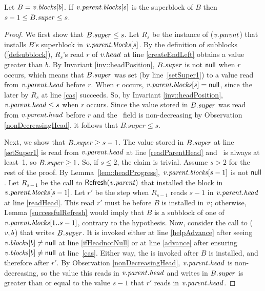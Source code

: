 \begin{lemma}
\label{superRelation}
Let $B=\mbox{\textnormal{\textit{v}}}.\mbox{\textnormal{\textit{blocks}}}[b]$.
If $\mbox{\textnormal{\textit{v}}}.\mbox{\textit{parent.blocks}}[s]$ is the superblock of $B$ then $s-1\leq B.\mbox{\textit{super}}\leq s$.
\end{lemma}
\begin{proof}
We first show that $B.\mbox{\textit{super}}\leq s$.
Let $R_s$ be the instance of ($\mbox{\textnormal{\textit{v}}}.\mbox{\textit{parent}}$) that installs $B$'s superblock 
in $\mbox{\textnormal{\textit{v}}}.\mbox{\textit{parent.blocks}}[s]$.
By the definition of subblocks (\ref{defsubblock}), $R_s$'s read $r$ of $\mbox{\textnormal{\textit{v}}}.head$ at line \ref{createEndLeft} %
obtains a value greater than $b$.
By Invariant \ref{inv::headPosition}, $B.\mbox{\textit{super}}$ is not $\mbox{\sf null}$ when $r$ occurs, which means
that $B.\mbox{\textit{super}}$ was set (by line~\ref{setSuper1}) to a value read from $\mbox{\textnormal{\textit{v}}}.\mbox{\textit{parent}}.\mbox{\textit{head}}$ before $r$.
When $r$ occurs, $\mbox{\textnormal{\textit{v}}}.\mbox{\textit{parent.blocks}}[s] = \mbox{\sf null}$, since the later  by $R_s$ at line
\ref{cas} succeeds.
So, by Invariant \ref{inv::headPosition}, $\mbox{\textnormal{\textit{v}}}.\mbox{\textit{parent}}.\mbox{\textit{head}} \leq s$ when $r$ occurs.
Since the value stored in $B.\mbox{\textit{super}}$ was read from $\mbox{\textnormal{\textit{v}}}.\mbox{\textit{parent.head}}$ before $r$ and the \head\ field is non-decreasing by Observation \ref{nonDecreasingHead}, it follows that $B.super\leq s$.

Next, we show that $B.\mbox{\textit{super}}\geq s-1$.
The value stored in $B.\mbox{\textit{super}}$ at line \ref{setSuper1} is read from $\mbox{\textnormal{\textit{v}}}.\mbox{\textit{parent}}.\mbox{\textit{head}}$ at line \ref{readParentHead} and \head\ is always at least~1, so $B.\mbox{\textit{super}} \geq 1$.
So, if $s\leq 2$, the claim is trivial.  Assume $s>2$ for the rest of the proof.
By Lemma~\ref{lem::headProgress}, $\mbox{\textnormal{\textit{v}}}.\mbox{\textit{parent.blocks}}[s-1]$ is not $\mbox{\sf null}$.  Let $R_{s-1}$ be the call to
${\sf Refresh}(\mbox{\textnormal{\textit{v}}}.\mbox{\textit{parent}})$ that installed the block in $\mbox{\textnormal{\textit{v}}}.\mbox{\textit{parent.blocks}}[s-1]$.
Let $r'$ be the step when $R_{s-1}$ reads $s-1$ in $\mbox{\textnormal{\textit{v}}}.\mbox{\textit{parent}}.\mbox{\textit{head}}$ at line \ref{readHead}.
This read $r'$ must be before $B$ is installed in $\mbox{\textnormal{\textit{v}}}$;
otherwise, Lemma \ref{successfulRefresh} would imply that $B$ is a subblock of one of 
$\mbox{\textnormal{\textit{v}}}.\mbox{\textit{parent.blocks}}[1..s-1]$, contrary to the hypothesis.
Now, consider the call to ($\mbox{\textnormal{\textit{v}}}, b$) that writes $B.\mbox{\textit{super}}$.
It is invoked either 
at line \ref{helpAdvance} after seeing $\mbox{\textnormal{\textit{v}}}.\mbox{\textit{blocks}}[b]\neq \mbox{\sf null}$ at line \ref{ifHeadnotNull}
or at line \ref{advance} after ensuring $\mbox{\textnormal{\textit{v}}}.\mbox{\textit{blocks}}[b]\neq \mbox{\sf null}$ at line~\ref{cas}.
Either way, the  is invoked after $B$ is installed, and therefore after $r'$.
By Observation \ref{nonDecreasingHead}, $\mbox{\textnormal{\textit{v}}}.\mbox{\textit{parent}}.\mbox{\textit{head}}$ is non-decreasing, so 
the value this  reads in $\mbox{\textnormal{\textit{v}}}.\mbox{\textit{parent}}.\mbox{\textit{head}}$ and
writes in $B.\mbox{\textit{super}}$ is greater than or equal to the value $s-1$ that $r'$ reads in $\mbox{\textnormal{\textit{v}}}.\mbox{\textit{parent}}.\mbox{\textit{head}}$.
\end{proof}


